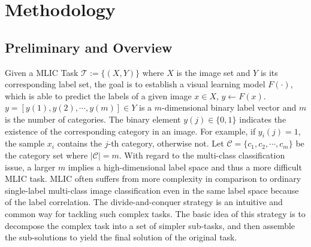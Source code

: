 \documentclass{article}
\begin{document}
\vspace{-0.2cm}
\section{Methodology}
\vspace{-0.1cm}
\subsection{Preliminary and Overview}
Given a MLIC Task $\mathcal{T}:=\{(X,Y)\}$ where $X$ is the image set and $Y$ is its corresponding label set, the goal is to establish a visual learning model $F(\cdot)$, which is able to predict the labels of a given image $x \in X$, $y\leftarrow F(x)$. $y=[y(1),y(2),\cdots,y(m)]\in Y$ is a $m$-dimensional binary label vector and $m$ is the number of categories.
The binary element $y(j)\in \{0,1\}$ indicates the existence of the corresponding category in an image.
For example, if $y_{i}(j)=1$, the sample $x_i$ contains the $j$-th category, otherwise not.
Let $\mathcal{C}=\{c_1,c_2,\cdots, c_m\}$ be the category set where $|\mathcal{C}|=m$.
With regard to the multi-class classification issue, a larger $m$ implies a high-dimensional label space and thus a more difficult MLIC task.
MLIC often suffers from more complexity in comparison to ordinary single-label multi-class image classification even in the same label space because of the label correlation.
The divide-and-conquer strategy is an intuitive and common way for tackling such complex tasks.
The basic idea of this strategy is to decompose the complex task into a set of simpler sub-tasks, and then assemble the sub-solutions to yield the final solution of the original task.
\end{document}
